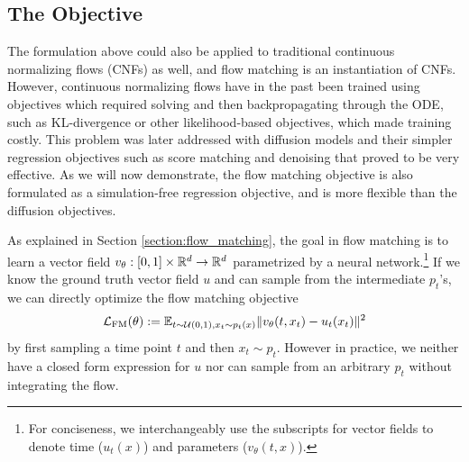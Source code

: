 \subsection{The Objective}

The formulation above could also be applied to traditional continuous normalizing flows (CNFs) \citep{chenNeuralOrdinaryDifferential2018a} as well, and flow matching is an instantiation of CNFs. However, continuous normalizing flows have in the past been trained using objectives which required solving and then backpropagating through the ODE, such as KL-divergence or other likelihood-based objectives, which made training costly. This problem was later addressed with diffusion models and their simpler regression objectives such as score matching and denoising \citep{sohl-dicksteinDeepUnsupervisedLearning2015, songScoreBasedGenerativeModeling2021a,hoDenoisingDiffusionProbabilistic2020} that proved to be very effective. As we will now demonstrate, the flow matching objective is also formulated as a simulation-free regression objective, and is more flexible than the diffusion objectives. 

As explained in Section \ref{section:flow_matching}, the goal in flow matching is to learn a vector field $v_\theta: [0,1] \times \mathbb{R}^d \to \mathbb{R}^d$ parametrized by a neural network.\footnote{For conciseness, we interchangeably use the subscripts for vector fields to denote time ($u_t(x)$) and parameters ($v_\theta(t,x)$).} If we know the ground truth vector field $u$ and can sample from the intermediate $p_t$'s, we can directly optimize the flow matching objective 
\begin{equation} \label{eq:fm_objective}
    \mathcal{L}_{\text{FM}}(\theta) := \mathbb{E}_{t \sim \mathcal{U}(0,1), x_t \sim p_t(x)} \Vert v_\theta(t, x_t) - u_t(x_t) \Vert ^2
\end{equation}
by first sampling a time point $t$ and then $x_t \sim p_t$. However in practice, we neither have a closed form expression for $u$ nor can sample from an arbitrary $p_t$ without integrating the flow. 

